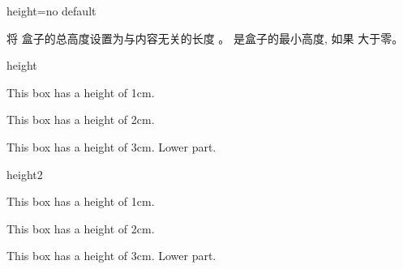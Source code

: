 \begin{docTcbKey}{height}{=}{no default}

将%
盒子的总高度设置为与内容无关的长度  。  是盒子的最小高度, 如果
 大于零。
\begin{exdispExample}{height}

\begin{tcolorbox}[height=1cm,valign=center]
  This box has a height of 1cm.
\end{tcolorbox}
\begin{tcolorbox}[height=2cm,valign=center]
  This box has a height of 2cm.
\end{tcolorbox}
\begin{tcolorbox}[height=3cm,split=0.5,valign=center,valign lower=center]
  This box has a height of 3cm.
  \tcblower
  Lower part.
\end{tcolorbox}
\end{exdispExample}

\begin{exdispExample}{height2}
  
  \begin{tcolorbox}[height=1cm,valign=center]
    This box has a height of 1cm.
  \end{tcolorbox}
  \begin{tcolorbox}[height=2cm,valign=center]
    This box has a height of 2cm.
  \end{tcolorbox}
  \begin{tcolorbox}[height=3cm,split=0.5,valign=center,valign lower=center]
    This box has a height of 3cm.
    \tcblower
    Lower part.
  \end{tcolorbox}
  \end{exdispExample}
\end{docTcbKey}



